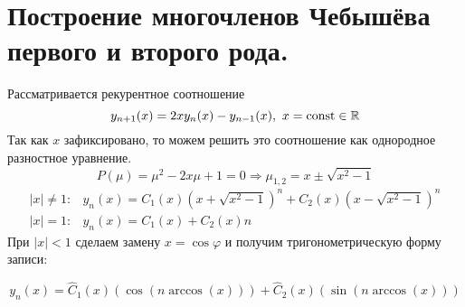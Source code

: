\section{Построение многочленов Чебышёва первого и второго рода.}

Рассматривается рекурентное соотношение
\[y_{n+1}(x)=2xy_n(x)-y_{n-1}(x),\ x=\const\in\R\]
Так как $x$ зафиксировано, то можем решить
это соотношение как однородное разностное уравнение.
\[P(\mu)=\mu^2-2x\mu+1=0\Rightarrow\mu_{1,2}=x\pm\sqrt{x^2-1}\]
\begin{equation}\label{cheb::diff}
  \begin{array}{cc}
    |x|\neq1: & y_n(x)=C_1(x)(x+\sqrt{x^2-1})^n+C_2(x)(x-\sqrt{x^2-1})^n \\
    |x|=1:    & y_n(x)=C_1(x)+C_2(x)n
  \end{array}
\end{equation}
При $|x|<1$ сделаем замену $x=\cos\varphi$ и получим тригонометрическую форму записи:

\[y_n(x)=\hat{C}_1(x)(\cos(n\arccos(x)))+\hat{C}_2(x)(\sin(n\arccos(x)))\]

